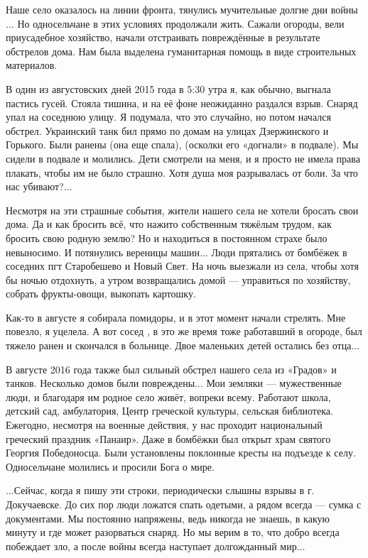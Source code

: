 Наше село оказалось на линии фронта, тянулись мучительные долгие дни войны$\ldots$ Но
односельчане в этих условиях продолжали жить. Сажали огороды, вели приусадебное
хозяйство, начали отстраивать повреждённые в результате обстрелов дома. Нам
была выделена гуманитарная помощь в виде строительных материалов.

В один из августовских дней 2015 года в 5:30 утра я, как обычно, выгнала
пастись гусей. Стояла тишина, и на её фоне неожиданно раздался взрыв. Снаряд
упал на соседнюю улицу. Я подумала, что это случайно, но потом начался обстрел.
Украинский танк бил прямо по домам на улицах Дзержинского и Горького. Были
ранены  (она еще спала),  (осколки его
«догнали» в подвале). Мы сидели в подвале и молились. Дети смотрели на меня, и
я просто не имела права плакать, чтобы им не было страшно. Хотя душа моя
разрывалась от боли. За что нас убивают?$\ldots$

Несмотря на эти страшные события, жители нашего села не хотели бросать свои
дома. Да и как бросить всё, что нажито собственным тяжёлым трудом, как бросить
свою родную землю? Но и находиться в постоянном страхе было невыносимо. И
потянулись вереницы машин$\ldots$ Люди прятались от бомбёжек в соседних пгт
Старобешево и Новый Свет. На ночь выезжали из села, чтобы хотя бы ночью
отдохнуть, а утром возвращались домой --- управиться по хозяйству, собрать
фрукты-овощи, выкопать картошку.

Как-то в августе я собирала помидоры, и в этот момент начали стрелять. Мне
повезло, я уцелела. А вот сосед , в это же время тоже работавший в
огороде, был тяжело ранен и скончался в больнице. Двое маленьких детей остались
без отца$\ldots$

В августе 2016 года также был сильный обстрел нашего села из «Градов» и танков.
Несколько домов были повреждены$\ldots$ Мои земляки --- мужественные люди, и благодаря
им родное село живёт, вопреки всему. Работают школа, детский сад, амбулатория,
Центр греческой культуры, сельская библиотека. Ежегодно, несмотря на военные
действия, у нас проходит национальный греческий праздник «Панаир». Даже в
бомбёжки был открыт храм святого Георгия Победоносца. Были установлены
поклонные кресты на подъезде к селу. Односельчане молились и просили Бога о
мире.

$\ldots$Сейчас, когда я пишу эти строки, периодически слышны взрывы в г. Докучаевске.
До сих пор люди ложатся спать одетыми, а рядом всегда --- сумка с документами. Мы
постоянно напряжены, ведь никогда не знаешь, в какую минуту и где может
разорваться снаряд. Но мы верим в то, что добро всегда побеждает зло, а после
войны всегда наступает долгожданный мир$\ldots$

